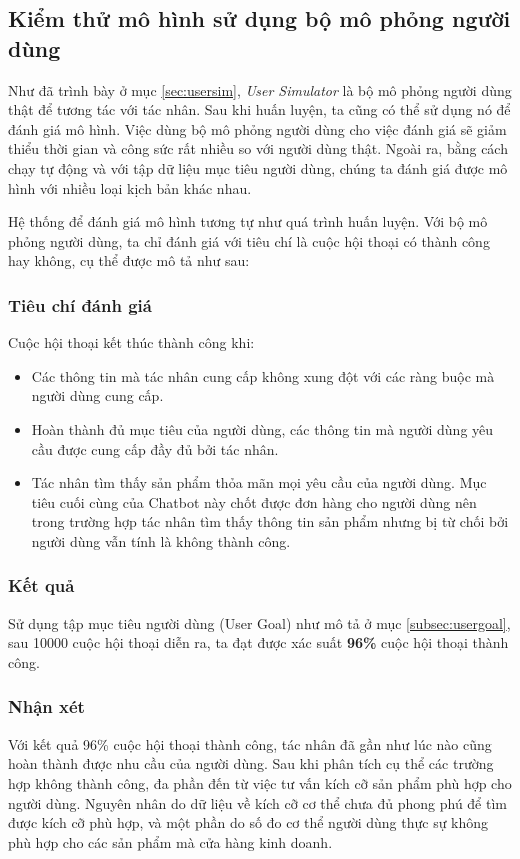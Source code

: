 \subsection{Kiểm thử mô hình sử dụng bộ mô phỏng người dùng}
Như đã trình bày ở mục \ref{sec:usersim}, \textit{User Simulator} là bộ mô phỏng người dùng thật để tương tác với tác nhân. Sau khi huấn luyện, ta cũng có thể sử dụng nó để đánh giá mô hình. Việc dùng bộ mô phỏng người dùng cho việc đánh giá sẽ giảm thiểu thời gian và công sức rất nhiều so với người dùng thật. Ngoài ra, bằng cách chạy tự động và với tập dữ liệu mục tiêu người dùng, chúng ta đánh giá được mô hình với nhiều loại kịch bản khác nhau. 

Hệ thống để đánh giá mô hình tương tự như quá trình huấn luyện. Với bộ mô phỏng người dùng, ta chỉ đánh giá với tiêu chí là cuộc hội thoại có thành công hay không, cụ thể được mô tả như sau:

\subsubsection{Tiêu chí đánh giá}
Cuộc hội thoại kết thúc thành công khi:

\begin{itemize}
    \item Các thông tin mà tác nhân cung cấp không xung đột với các ràng buộc mà người dùng cung cấp.
    \item Hoàn thành đủ mục tiêu của người dùng, các thông tin mà người dùng yêu cầu được cung cấp đầy đủ bởi tác nhân.
    \item Tác nhân tìm thấy sản phẩm thỏa mãn mọi yêu cầu của người dùng. Mục tiêu cuối cùng của Chatbot này chốt được đơn hàng cho người dùng nên trong trường hợp tác nhân tìm thấy thông tin sản phẩm nhưng bị từ chối bởi người dùng vẫn tính là không thành công.
\end{itemize}

\subsubsection{Kết quả}
Sử dụng tập mục tiêu người dùng (User Goal) như mô tả ở mục \ref{subsec:usergoal}, sau 10000 cuộc hội thoại diễn ra, ta đạt được xác suất \textbf{96\%} cuộc hội thoại thành công. 

\subsubsection{Nhận xét}
Với kết quả 96\% cuộc hội thoại thành công, tác nhân đã gần như lúc nào cũng hoàn thành được nhu cầu của người dùng. Sau khi phân tích cụ thể các trường hợp không thành công, đa phần đến từ việc tư vấn kích cỡ sản phẩm phù hợp cho người dùng. Nguyên nhân do dữ liệu về kích cỡ cơ thể chưa đủ phong phú để tìm được kích cỡ phù hợp, và một phần do số đo cơ thể người dùng thực sự không phù hợp cho các sản phẩm mà cửa hàng kinh doanh.

